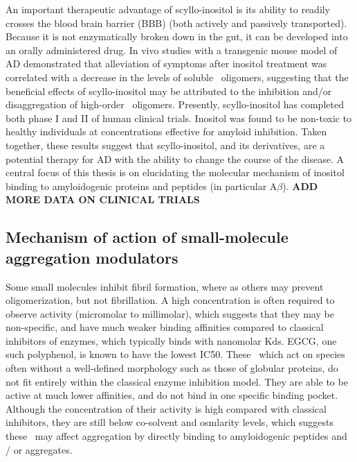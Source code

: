 An important therapeutic advantage of scyllo-inositol is its ability to readily crosses the bloodbrain barrier (BBB) (both actively and passively transported). Because it is not enzymatically broken down in the gut, it can be developed into an orally administered drug. %
In vivo studies with a transgenic mouse model of AD demonstrated that alleviation of symptoms after inositol treatment was correlated with a decrease in the levels of soluble \abeta\ oligomers, suggesting that the beneficial effects of scyllo-inositol may be attributed to the inhibition and/or disaggregation of high-order \abeta\ oligomers.\cite{McLaurin:2006eb}
Presently, scyllo-inositol has completed both phase I and II of human clinical trials.  Inositol was found to be non-toxic to healthy individuals at concentrations effective for amyloid inhibition. Taken together, these results suggest that scyllo-inositol, and its derivatives, are a potential therapy for AD with the ability to change the course of the disease.\cite{Nitz:2008jl,Sun:2008ko}  A central focus of this thesis is on elucidating the molecular mechanism of inositol binding to amyloidogenic proteins and peptides (in particular A$\beta$).
\textbf{ADD MORE DATA ON CLINICAL TRIALS}

\subsection{Mechanism of action of small-molecule aggregation modulators}

Some small molecules inhibit fibril formation, where as others may prevent oligomerization, but not fibrillation. A high concentration is often required to observe activity (micromolar to millimolar), which suggests that they may be non-specific, and have much weaker binding affinities compared to classical inhibitors of enzymes, which typically binds with nanomolar Kds. EGCG, one such polyphenol, is known to have the lowest IC50.  These \smi\ which act on species often without a well-defined morphology such as those of globular proteins, do not fit entirely within the classical enzyme inhibition model. They are able to be active at much lower affinities, and do not bind in one specific binding pocket.  Although the concentration of their activity is high compared with classical inhibitors,  they are still below co-solvent and osmlarity levels, which suggests these \smi\ may affect aggregation by directly binding to amyloidogenic peptides and / or aggregates.

